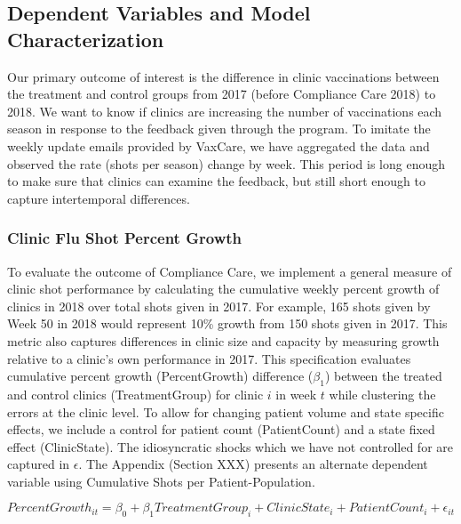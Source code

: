 \begin{onehalfspace}
 \subsection{Dependent Variables and Model Characterization}
 Our primary outcome of interest is the difference in clinic vaccinations between the treatment and control groups from 2017 (before Compliance Care 2018) to 2018. We want to know if clinics are increasing the number of vaccinations each season in response to the feedback given through the program. To imitate the weekly update emails provided by VaxCare, we have aggregated the data and observed the rate (shots per season) change by week. This period is long enough to make sure that clinics can examine the feedback, but still short enough to capture intertemporal differences. 
 
 \subsubsection{Clinic Flu Shot Percent Growth}
 To evaluate the outcome of Compliance Care, we implement a general measure of clinic shot performance by calculating the cumulative weekly percent growth of clinics in 2018 over total shots given in 2017. For example, 165 shots given by Week 50 in 2018 would represent 10\% growth from 150 shots given in 2017. This metric also captures differences in clinic size and capacity by measuring growth relative to a clinic’s own performance in 2017. This specification evaluates cumulative percent growth (PercentGrowth) difference ($\beta_1$) between the treated and control clinics (TreatmentGroup) for clinic $i$ in week $t$ while clustering the errors at the clinic level. To allow for changing patient volume and state specific effects, we include a control for patient count (PatientCount) and a state fixed effect (ClinicState). The idiosyncratic shocks which we have not controlled for are captured in $\epsilon$. The Appendix (Section XXX) presents an alternate dependent variable using Cumulative Shots per Patient-Population.
 
  \begin{equation} %
       PercentGrowth_{it} = \beta_0 + \beta_1 TreatmentGroup_i + ClinicState_i + PatientCount_i + \epsilon_{it} 
  \end{equation}
 

\end{onehalfspace}
